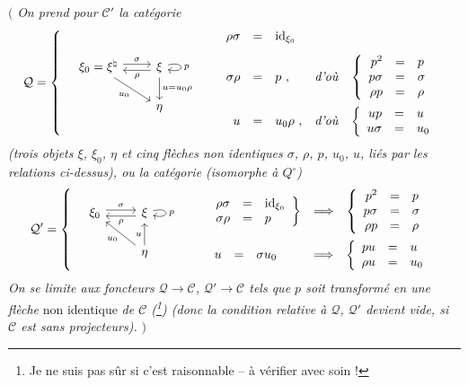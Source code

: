 \documentclass[11pt]{article}
\newcommand{\msp}[1]{\marginpar{\footnotesize [#1]}}
\begin{document}
\msp{474}

$\Big($ \textit{On prend pour $\mathcal{C}'$ la catégorie}
\[
\mathcal{Q} = \left\{ \quad
\begin{tikzcd}[column sep=2.2em]
\xi_0 = \xi^\natural \arrow[r, shift left, "\sigma"] \arrow[dr, "u_0"'] & \xi \arrow[l, shift left, "\rho"] \arrow[d, "u = u_0\rho"] \arrow[loop right, "p"] \\
 & \eta
\end{tikzcd}
\qquad
\begin{array}{rclll}
\rho\sigma & = & \mathrm{id}_{\xi_0} & & \\[2ex]
\sigma\rho & = & p\ , & \text{\textit{d'où}} & \left\{\begin{array}{rcl} p^2 & = & p \\ p\sigma & = & \sigma \\ \rho p & = & \rho \end{array}\right. \\[4ex]
u & = & u_0\rho\ , & \text{\textit{d'où}} & \left\{\begin{array}{rcl} up & = & u \\ u\sigma & = & u_0 \end{array}\right.
\end{array}
\right.
\]
\textit{(trois objets $\xi$, $\xi_0$, $\eta$ et cinq flèches non identiques $\sigma$, $\rho$, $p$, $u_0$, $u$, liés par les relations ci-dessus), ou la catégorie (isomorphe à $Q^\circ$)} %
\[
\mathcal{Q}' = \left\{ \quad
\begin{tikzcd}
\xi_0 \arrow[r, shift left, "\sigma"] & \xi \arrow[l, shift left, "\rho"] \arrow[loop right, "p"] \\
 & \eta \arrow[ul, "u_0"] \arrow[u, "u"]
\end{tikzcd}
\qquad
\begin{array}{lcl}
\left.\begin{array}{rcl} \rho\sigma & = & \mathrm{id}_{\xi_0} \\ \sigma\rho & = & p \end{array}\right\} & \Longrightarrow & \left\{\begin{array}{rcl} p^2 & = & p \\ p\sigma & = & \sigma \\ \rho p & = & \rho \end{array}\right. \\[4ex]
\begin{array}{rcl} u & = & \sigma u_0 \end{array} & \Longrightarrow & \left\{\begin{array}{rcl} pu & = & u \\ \rho u & = & u_0 \end{array}\right.
\end{array}
\right.
\]
\textit{On se limite aux foncteurs $\mathcal{Q} \longrightarrow \mathcal{C}$, $\mathcal{Q}' \longrightarrow \mathcal{C}$ tels que $p$ soit transformé en une flèche} non identique \textit{de $\mathcal{C}$ (\footnote[195]{Je ne suis pas sûr si c'est raisonnable -- à vérifier avec soin !}) (donc la condition relative à $\mathcal{Q}$, $\mathcal{Q}'$ devient vide, si $\mathcal{C}$ est sans projecteurs).} $\Big)$
\end{document}
